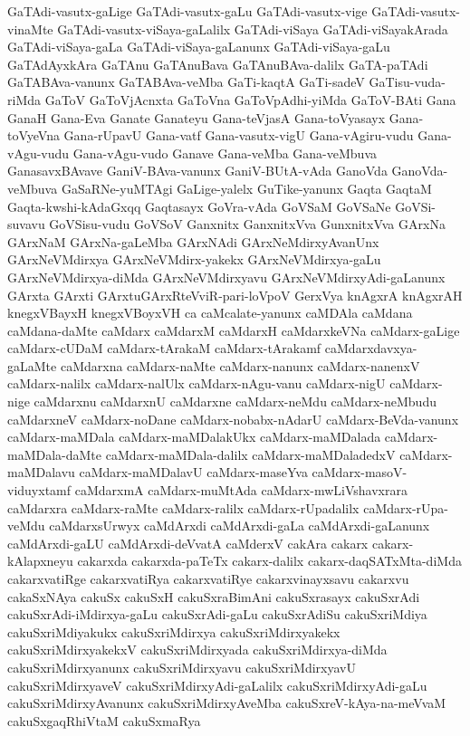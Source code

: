 {GaTAdi-vasutx-gaLige
GaTAdi-vasutx-gaLu
GaTAdi-vasutx-vige
GaTAdi-vasutx-vinaMte
GaTAdi-vasutx-viSaya-gaLalilx
GaTAdi-viSaya
GaTAdi-viSayakArada
GaTAdi-viSaya-gaLa
GaTAdi-viSaya-gaLanunx
GaTAdi-viSaya-gaLu
GaTAdAyxkAra
GaTAnu
GaTAnuBava
GaTAnuBAva-dalilx
GaTA-paTAdi
GaTABAva-vanunx
GaTABAva-veMba
GaTi-kaqtA
GaTi-sadeV
GaTisu-vuda-riMda
GaToV
GaToVjAcnxta
GaToVna
GaToVpAdhi-yiMda
GaToV-BAti
Gana
GanaH
Gana-Eva
Ganate
Ganateyu
Gana-teVjasA
Gana-toVyasayx
Gana-toVyeVna
Gana-rUpavU
Gana-vatf
Gana-vasutx-vigU
Gana-vAgiru-vudu
Gana-vAgu-vudu
Gana-vAgu-vudo
Ganave
Gana-veMba
Gana-veMbuva
GanasavxBAvave
GaniV-BAva-vanunx
GaniV-BUtA-vAda
GanoVda
GanoVda-veMbuva
GaSaRNe-yuMTAgi
GaLige-yalelx
GuTike-yanunx
Gaqta
GaqtaM
Gaqta-kwshi-kAdaGxqq
Gaqtasayx
GoVra-vAda
GoVSaM
GoVSaNe
GoVSi-suvavu
GoVSisu-vudu
GoVSoV
Ganxnitx
GanxnitxVva
GunxnitxVva
GArxNa
GArxNaM
GArxNa-gaLeMba
GArxNAdi
GArxNeMdirxyAvanUnx
GArxNeVMdirxya
GArxNeVMdirx-yakekx
GArxNeVMdirxya-gaLu
GArxNeVMdirxya-diMda
GArxNeVMdirxyavu
GArxNeVMdirxyAdi-gaLanunx
GArxta
GArxti
GArxtuGArxRteVviR-pari-loVpoV
GerxVya
knAgxrA
knAgxrAH
knegxVBayxH
knegxVBoyxVH
ca
caMcalate-yanunx
caMDAla
caMdana
caMdana-daMte
caMdarx
caMdarxM
caMdarxH
caMdarxkeVNa
caMdarx-gaLige
caMdarx-cUDaM
caMdarx-tArakaM
caMdarx-tArakamf
caMdarxdavxya-gaLaMte
caMdarxna
caMdarx-naMte
caMdarx-nanunx
caMdarx-nanenxV
caMdarx-nalilx
caMdarx-nalUlx
caMdarx-nAgu-vanu
caMdarx-nigU
caMdarx-nige
caMdarxnu
caMdarxnU
caMdarxne
caMdarx-neMdu
caMdarx-neMbudu
caMdarxneV
caMdarx-noDane
caMdarx-nobabx-nAdarU
caMdarx-BeVda-vanunx
caMdarx-maMDala
caMdarx-maMDalakUkx
caMdarx-maMDalada
caMdarx-maMDala-daMte
caMdarx-maMDala-dalilx
caMdarx-maMDaladedxV
caMdarx-maMDalavu
caMdarx-maMDalavU
caMdarx-maseYva
caMdarx-masoV-viduyxtamf
caMdarxmA
caMdarx-muMtAda
caMdarx-mwLiVshavxrara
caMdarxra
caMdarx-raMte
caMdarx-ralilx
caMdarx-rUpadalilx
caMdarx-rUpa-veMdu
caMdarxsUrwyx
caMdArxdi
caMdArxdi-gaLa
caMdArxdi-gaLanunx
caMdArxdi-gaLU
caMdArxdi-deVvatA
caMderxV
cakAra
cakarx
cakarx-kAlapxneyu
cakarxda
cakarxda-paTeTx
cakarx-dalilx
cakarx-daqSATxMta-diMda
cakarxvatiRge
cakarxvatiRya
cakarxvatiRye
cakarxvinayxsavu
cakarxvu
cakaSxNAya
cakuSx
cakuSxH
cakuSxraBimAni
cakuSxrasayx
cakuSxrAdi
cakuSxrAdi-iMdirxya-gaLu
cakuSxrAdi-gaLu
cakuSxrAdiSu
cakuSxriMdiya
cakuSxriMdiyakukx
cakuSxriMdirxya
cakuSxriMdirxyakekx
cakuSxriMdirxyakekxV
cakuSxriMdirxyada
cakuSxriMdirxya-diMda
cakuSxriMdirxyanunx
cakuSxriMdirxyavu
cakuSxriMdirxyavU
cakuSxriMdirxyaveV
cakuSxriMdirxyAdi-gaLalilx
cakuSxriMdirxyAdi-gaLu
cakuSxriMdirxyAvanunx
cakuSxriMdirxyAveMba
cakuSxreV-kAya-na-meVvaM
cakuSxgaqRhiVtaM
cakuSxmaRya
}
